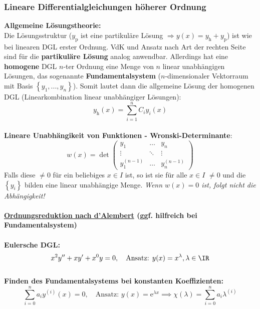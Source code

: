 \subsubsection{Lineare Differentialgleichungen höherer Ordnung}
\textbf{Allgemeine Lösungstheorie:}\\
Die Lösungsstruktur ($y_\text{p}$ ist eine partikuläre Lösung $\Rightarrow y(x)=y_\text{h}+y_\text{p}$) ist wie bei linearen DGL erster Ordnung. VdK und Ansatz nach Art der rechten Seite sind für die \textbf{partikuläre Lösung} analog anwendbar. Allerdings hat eine \textbf{homogene} DGL $n$-ter Ordnung eine Menge von $n$ linear unabhängigen Lösungen, das sogenannte \textbf{Fundamentalsystem} ($n$-dimensionaler Vektorraum mit Basis $\left\{y_1,...,y_n\right\}$). Somit lautet dann die allgemeine Lösung der homogenen DGL (Linearkombination linear unabhängiger Lösungen):
\begin{equation}
	y_\text{h}(x)=\sum\limits_{i=1}^n C_iy_i(x)
\end{equation}\\
\textbf{Lineare Unabhängikeit von Funktionen - Wronski-Determinante}:\\
\begin{equation}
	w(x)=\det\begin{pmatrix} 
	y_{1} & \dots  & y_{n}\\
	\vdots & \ddots & \vdots\\
	y^{(n-1)}_1 & \dots  & y^{(n-1)}_n 
	\end{pmatrix}
\end{equation}
Falls diese $\neq 0$ für ein beliebiges $x\in I$ ist, so ist sie für alle $x\in I$ $\neq 0$ und die $\left\{y_i\right\}$ bilden eine linear unabhängige Menge. \textit{Wenn $w(x)=0$ ist, folgt nicht die Abhängigkeit!}\\\\
\textbf{\href{https://de.wikipedia.org/wiki/Reduktionsverfahren_von_d\%E2\%80\%99Alembert}{Ordnungsreduktion nach d'Alembert} (ggf. hilfreich bei Fundamentalsystem)}\\\\
\textbf{Eulersche DGL:}\\
\begin{equation}\label{EulerDGL}
	x^2y^{\prime\prime}+xy^\prime+x^0y=0,\quad\text{Ansatz: } y(x)=x^\lambda, \lambda \in \IR
\end{equation}\\
\textbf{Finden des Fundamentalsystems bei konstanten Koeffizienten:}\\
\begin{equation}\label{Fund}
	\sum\limits_{i=0}^n a_iy^{(i)}(x) = 0,\quad\text{Ansatz: } y(x)=\mathrm{e}^{\lambda x} \implies \chi (\lambda)= \sum\limits_{i=0}^n a_i\lambda^{(i)} 
\end{equation}

